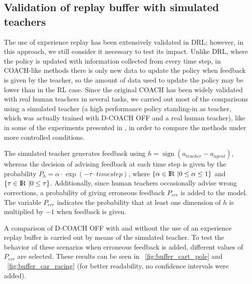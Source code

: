 \subsection{Validation of replay buffer with simulated teachers}
The use of experience replay has been extensively validated in DRL; however, in this approach, we  still consider it necessary to test its impact. Unlike DRL, where the policy is updated with information collected from every time step, in COACH-like methods there is only new data to update the policy when feedback is given by the teacher, so the amount of data used to update the policy may be lower than in the RL case. Since the original COACH has been widely validated with real human teachers in several tasks, we carried out most of the comparisons using  a simulated teacher (a high performance policy standing-in as teacher, which was actually trained with D-COACH OFF and a real human teacher), like in some of the experiments presented in \cite{Celemin2018AnInteractive}, in order to compare the methods under more controlled conditions. 

The simulated teacher generates feedback using $h = \operatorname{sign}(a_{\mathit{teacher}} - a_{\mathit{agent}})$, whereas the decision of advising feedback at each time step is given by the probability $P_{h} = \alpha \cdot\exp(-\tau\cdot \mathit{timestep})$, where $\{\alpha \in {\rm I\!R}\ | 0 \le \alpha \le 1\}$ and $\{\tau \in {\rm I\!R}\ | 0 \le \tau\}$. Additionally, since human teachers occasionally advise wrong corrections, a probability of giving erroneous feedback $P_{\mathit{err}}$ is added to the model. The variable $P_{\mathit{err}}$ indicates the probability that at least one dimension of $h$ is multiplied by $-1$ when feedback is given.

A comparison of D-COACH OFF with and without the use of an experience replay buffer is carried out by means of the simulated teacher. To test the behavior of these scenarios when erroneous feedback is added, different values of $P_{\mathit{err}}$ are selected. These results can be seen in \figurename~{\ref{fig:buffer_cart_pole}} and \figurename~{\ref{fig:buffer_car_racing}} (for better readability, no confidence intervals were added).

